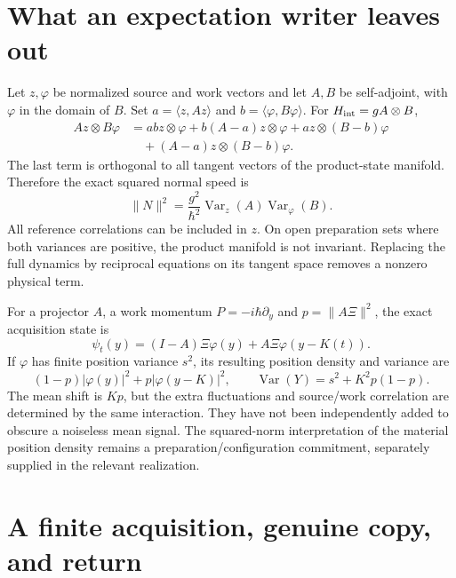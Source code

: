 \documentclass[11pt,oneside,openany]{book}
\theoremstyle{definition}
\theoremstyle{remark}\newtheorem{remark}[theorem]{Remark}
\begin{document}
\section{What an expectation writer leaves out}

Let $z,\varphi$ be normalized source and work vectors and let $A,B$ be self-adjoint, with $\varphi$ in the domain of $B$. Set $a=\langle z,Az\rangle$ and $b=\langle\varphi,B\varphi\rangle$. For $H_{\rm int}=gA\otimes B$,
\begin{align}
 Az\otimes B\varphi
 &=abz\otimes\varphi+b(A-a)z\otimes\varphi
   +az\otimes(B-b)\varphi\\
 &\quad +(A-a)z\otimes(B-b)\varphi.
 \label{mat:normaldecomp}
\end{align}
The last term is orthogonal to all tangent vectors of the product-state manifold. Therefore the exact squared normal speed is
\begin{equation}
 \|N\|^2=\frac{g^2}{\hbar^2}
          \operatorname{Var}_z(A)\operatorname{Var}_\varphi(B).
 \label{mat:normalspeed}
\end{equation}
All reference correlations can be included in $z$. On open preparation sets where both variances are positive, the product manifold is not invariant. Replacing the full dynamics by reciprocal equations on its tangent space removes a nonzero physical term.

For a projector $A$, a work momentum $P=-i\hbar\partial_y$ and $p=\|A\Xi\|^2$, the exact acquisition state is
\begin{equation}
 \psi_t(y)=(I-A)\Xi\varphi(y)+A\Xi\varphi(y-K(t)).
 \label{mat:translation}
\end{equation}
If $\varphi$ has finite position variance $s^2$, its resulting position density and variance are
\begin{equation}
 (1-p)|\varphi(y)|^2+p|\varphi(y-K)|^2,
 \qquad \operatorname{Var}(Y)=s^2+K^2p(1-p).
 \label{mat:variance}
\end{equation}
The mean shift is $Kp$, but the extra fluctuations and source/work correlation are determined by the same interaction. They have not been independently added to obscure a noiseless mean signal. The squared-norm interpretation of the material position density remains a preparation/configuration commitment, separately supplied in the relevant realization.

\section{A finite acquisition, genuine copy, and return}
\end{document}
